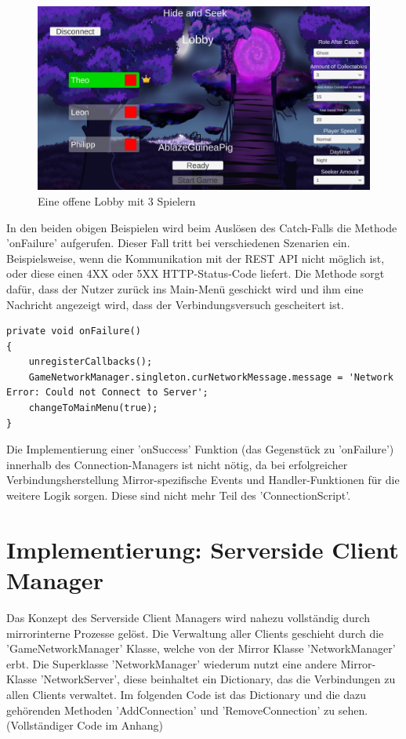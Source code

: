 \begin{figure}[H]
	\centering
	\includegraphics[width=120mm]{images/prototyp_lobby_menu.png}
	\caption[Prototyp Lobby Menu]{Eine offene Lobby mit 3 Spielern}
	\label{pic:prototyp_lobby_menu}
\end{figure}

In den beiden obigen Beispielen wird beim Auslösen des Catch-Falls die Methode 'onFailure' aufgerufen. Dieser Fall tritt bei verschiedenen Szenarien ein. Beispielsweise, wenn die Kommunikation mit der REST API nicht möglich ist, oder diese einen 4XX oder 5XX HTTP-Status-Code liefert. Die Methode sorgt dafür, dass der Nutzer zurück ins Main-Menü geschickt wird und ihm eine Nachricht angezeigt wird, dass der Verbindungsversuch gescheitert ist.

\begin{lstlisting}[caption= ConnectionScript.cs onFailure()]
private void onFailure()
{
	unregisterCallbacks();
	GameNetworkManager.singleton.curNetworkMessage.message = 'Network Error: Could not Connect to Server';
	changeToMainMenu(true);
}

\end{lstlisting}

Die Implementierung einer 'onSuccess' Funktion (das Gegenstück zu 'onFailure') innerhalb des Connection-Managers ist nicht nötig, da bei erfolgreicher Verbindungsherstellung Mirror-spezifische Events und Handler-Funktionen für die weitere Logik sorgen. Diese sind nicht mehr Teil des 'ConnectionScript'.

\section{Implementierung: Serverside Client Manager}

Das Konzept des Serverside Client Managers wird nahezu vollständig durch mirrorinterne Prozesse gelöst. Die Verwaltung aller Clients geschieht durch die 'GameNetworkManager' Klasse, welche von der Mirror Klasse 'NetworkManager' erbt. Die Superklasse 'NetworkManager' wiederum nutzt eine andere Mirror-Klasse 'NetworkServer', diese beinhaltet ein Dictionary, das die Verbindungen zu allen Clients verwaltet. Im folgenden Code ist das Dictionary und die dazu gehörenden Methoden 'AddConnection' und 'RemoveConnection' zu sehen. (Vollständiger Code im Anhang)

